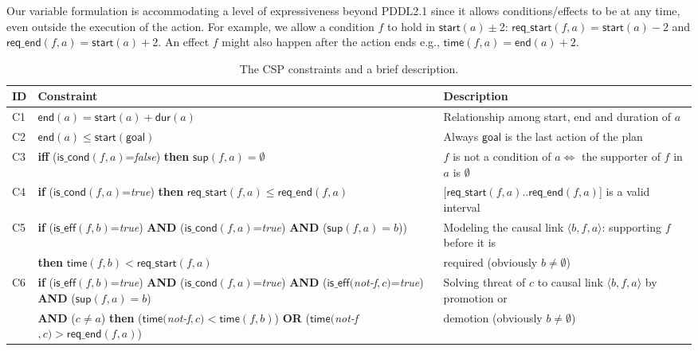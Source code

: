 \documentclass{ecai}
\newcommand{\tup}[1]{{\langle #1 \rangle}}
\newcommand{\dur}{\mathsf{dur}}    %
\newcommand{\iscond}{\mathsf{is\_cond}}    %
\newcommand{\iseff}{\mathsf{is\_eff}}    %
\newcommand{\start}{\mathsf{start}}%
\newcommand{\en}{\mathsf{end}}     %
\newcommand{\supp}{\mathsf{sup}}   %
\newcommand{\tim}{\mathsf{time}}   %
\newcommand{\reqs}{\mathsf{req\_{start}}} %
\newcommand{\reqe}{\mathsf{req\_{end}}}   %
\newcommand{\goal}{\mathsf{goal}}  %
\begin{document}
Our variable formulation is accommodating a level of expressiveness beyond PDDL2.1 since it allows conditions/effects to be at any time, even outside the execution of the action. For example, we allow a condition $f$ to hold in $\start(a)\pm$2: $\reqs(f,a)=\start(a)-2$ and $\reqe(f,a)=\start(a)+2$. An effect $f$ might also happen after the action ends e.g., $\tim(f,a)=\en(a)+2$. 

\begin{table*}
\begin{center}
\caption{The CSP constraints and a brief description.}	
\begin{scriptsize}
\begin{tabular}{lp{10.4cm}p{6.6cm}}
\hline
{\bf ID}&{\bf Constraint}&{\bf Description}\\\hline
			
C1& $\en(a)=\start(a)+\dur(a)$ & Relationship among start, end and duration of $a$ \\

C2& $\en(a) \leq \start(\goal)$ & Always $\goal$ is the last action of the plan \\

C3& \textbf{iff} ($\iscond(f,a)$=\textit{false}) \textbf{then} $\supp(f,a) = \emptyset$ & $f$ is not a condition of $a \iff $ the supporter of $f$ in $a$ is $\emptyset$ \\

C4& \textbf{if} ($\iscond(f,a)$=\textit{true}) \textbf{then} $\reqs(f,a) \leq \reqe(f,a)$ & [$\reqs(f,a)..\reqe(f,a)$] is a valid interval\\

C5& \textbf{if} ($\iseff(f,b)$=\textit{true}) \textbf{AND} ($\iscond(f,a)$=\textit{true}) \textbf{AND} ($\supp(f,a)=b$))  & Modeling the causal link $\tup{b,f,a}$: supporting $f$ before it is \\
&\hspace{0.5cm}\textbf{then} $\tim(f,b) < \reqs(f,a)$ & required (obviously $b \neq \emptyset$) \\

C6& \textbf{if} ($\iseff(f,b)$=\textit{true}) \textbf{AND} ($\iscond(f,a)$=\textit{true}) \textbf{AND} ($\iseff($\textit{not-f}$,c)$=\textit{true}) \textbf{AND} ($\supp(f,a)=b$) & Solving threat of $c$ to causal link $\tup{b,f,a}$ by promotion or \\
&\hspace{0.5cm}\textbf{AND} ($c \neq a$) \textbf{then} ($\tim($\textit{not-f}$,c) < \tim(f,b)$) \textbf{OR} ($\tim($\textit{not-f}$,c) > \reqe(f,a)$) & demotion (obviously $b \neq \emptyset$) \\


\end{tabular}
\end{scriptsize}
\end{center}
\end{table*}
\end{document}

